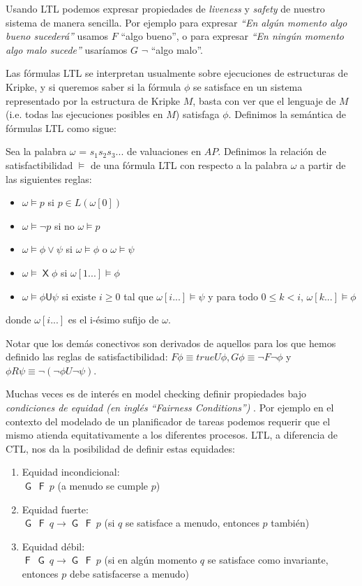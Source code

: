\documentclass[pdftex,a4paper,12pt]{book}
\newcommand{\X}{\mathop{\mathsf{X}}}
\newcommand{\G}{\mathop{\mathsf{G}}}
\newcommand{\F}{\mathop{\mathsf{F}}}
\newcommand{\U}{\mathbin{\textsf{U}}}
\begin{document}
Usando LTL podemos expresar propiedades de \textit{liveness} y \textit{safety} de nuestro sistema de manera sencilla. Por ejemplo para expresar \textit{``En alg\'un momento algo bueno suceder\'a''} usamos  $F$ ``algo bueno'', o para expresar \textit{``En ning\'un momento algo malo sucede''} usar\'iamos $G$ $\neg$ ``algo malo''.

Las f\'ormulas LTL se interpretan usualmente sobre ejecuciones de estructuras de Kripke, y si queremos saber si la f\'ormula $\phi$ se satisface en un sistema representado por la estructura de Kripke $M$, basta con ver que el lenguaje de $M$ (i.e. todas las ejecuciones posibles en $M$) satisfaga $\phi$. Definimos la sem\'antica de f\'ormulas LTL como sigue:

Sea la palabra $\omega$ = $s_1s_2s_3...$ de valuaciones en $AP$. Definimos la relaci\'on de satisfactibilidad $\models$ de una f\'ormula LTL con respecto a la palabra $\omega$ a partir de las siguientes reglas:
\begin{itemize}
\item $\omega \models p $ si $ p \in L(\omega[0])$
\item $\omega \models \neg p $ si no $\omega \models p$
\item $\omega \models \phi \vee \psi$ si $\omega \models \phi$ o $\omega \models \psi$
\item $\omega \models \X \phi$ si $\omega[1...] \models \phi$
\item $\omega \models \phi \U \psi$ si existe $i \geq 0$ tal que  $\omega[i...] \models \psi$ y para todo $0 \leq k < i$, $\omega[k...] \models \phi$ 
\end{itemize}
donde $\omega[i...]$ es el i-\'esimo sufijo de $\omega$.

Notar que los dem\'as conectivos son derivados de aquellos para los que hemos definido las reglas de satisfactibilidad: $F \phi \equiv true U \phi, G \phi \equiv \neg F \neg \phi$ y $\phi R \psi \equiv \neg(\neg\phi U \neg\psi).$

Muchas veces es de inter\'es en model checking definir propiedades bajo \textit{condiciones de equidad (en ingl\'es ``Fairness Conditions'')} . Por ejemplo en el contexto del modelado de un planificador de tareas podemos requerir que el mismo atienda equitativamente a los diferentes procesos. LTL, a diferencia de CTL, nos da la posibilidad de definir estas equidades:

\begin{enumerate}
\item Equidad incondicional:\\[0.3cm] $\G~\F~p$ (a menudo se cumple $p$)
\item Equidad fuerte:\\[0.3cm] $\G~\F~q \rightarrow \G~\F~p$ (si $q$ se satisface a menudo, entonces $p$ tambi\'en)
\item Equidad d\'ebil:\\[0.3cm] $\F~\G~q \rightarrow \G~\F~p$ (si en alg\'un momento $q$ se satisface como invariante, entonces $p$ debe satisfacerse a menudo)
\end{enumerate}
\end{document}
